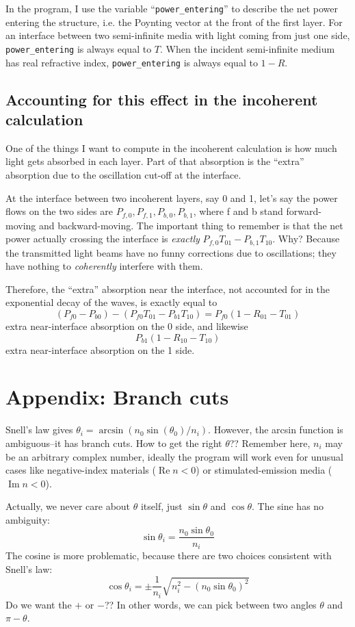 \documentclass[12pt]{article}
\renewcommand{\(}{\left(}
\renewcommand{\)}{\right)}
\renewcommand{\Im}{\operatorname{Im}}
\renewcommand{\Re}{\operatorname{Re}}
\begin{document}
In the program, I use the variable ``\verb=power_entering='' to describe the net power entering the structure, i.e. the Poynting vector at the front of the first layer. For an interface between two semi-infinite media with light coming from just one side, \verb=power_entering= is always equal to $T$. When the incident semi-infinite medium has real refractive index, \verb=power_entering= is always equal to $1-R$.

\subsection{Accounting for this effect in the incoherent calculation}

One of the things I want to compute in the incoherent calculation is how much light gets absorbed in each layer. Part of that absorption is the ``extra'' absorption due to the oscillation cut-off at the interface.

At the interface between two incoherent layers, say 0 and 1, let's say the power flows on the two sides are $P_{f,0},P_{f,1},P_{b,0},P_{b,1}$, where f and b stand forward-moving and backward-moving. The important thing to remember is that the net power actually crossing the interface is \emph{exactly} $P_{f,0}T_{01} - P_{b,1}T_{10}$. Why? Because the transmitted light beams have no funny corrections due to oscillations; they have  nothing to \emph{coherently} interfere with them.

Therefore, the ``extra'' absorption near the interface, not accounted for in the exponential decay of the waves, is exactly equal to
$$(P_{f0}-P_{b0}) - (P_{f0}T_{01} - P_{b1}T_{10}) = P_{f0}(1-R_{01}-T_{01})$$
extra near-interface absorption on the 0 side, and likewise
$$P_{b1}(1-R_{10}-T_{10})$$
extra near-interface absorption on the 1 side.

\section{Appendix: Branch cuts \label{appendixbranchcuts}}

Snell's law gives $\theta_i = \arcsin(n_0 \sin(\theta_0)/n_i)$. However, the arcsin function is ambiguous--it has branch cuts. How to get the right $\theta$?? Remember here, $n_i$ may be an arbitrary complex number, ideally the program will work even for unusual cases like negative-index materials ($\Re n <0$) or stimulated-emission media ($\Im n<0$).

Actually, we never care about $\theta$ itself, just $\sin \theta$ and $\cos \theta$. The sine has no ambiguity:
$$\sin \theta_i = \frac{n_0\sin \theta_0}{n_i}$$
The cosine is more problematic, because there are two choices consistent with Snell's law:
$$\cos \theta_i = \pm \frac{1}{n_i} \sqrt{n_i^2 - (n_0 \sin \theta_0)^2}$$
Do we want the $+$ or $-$?? In other words, we can pick between two angles $\theta$ and $\pi-\theta$.
\end{document}

